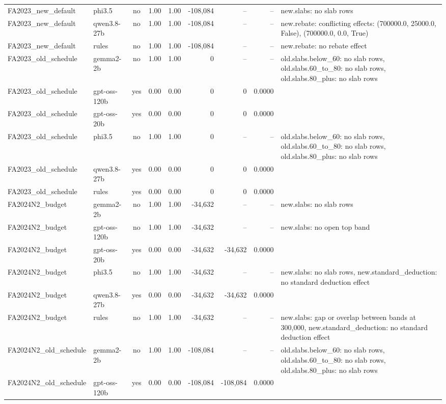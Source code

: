 \begin{table}[t]
\begin{tabular}{llcrrrrrl}
FA2023\_new\_default & phi3.5 & no & 1.00 & 1.00 & -108,084 & -- & -- & new.slabs: no slab rows \\
FA2023\_new\_default & qwen3.8-27b & no & 1.00 & 1.00 & -108,084 & -- & -- & new.rebate: conflicting effects: (700000.0, 25000.0, False), (700000.0, 0.0, True) \\
FA2023\_new\_default & rules & no & 1.00 & 1.00 & -108,084 & -- & -- & new.rebate: no rebate effect \\
FA2023\_old\_schedule & gemma2-2b & no & 1.00 & 1.00 & 0 & -- & -- & old.slabs.below\_60: no slab rows, old.slabs.60\_to\_80: no slab rows, old.slabs.80\_plus: no slab rows \\
FA2023\_old\_schedule & gpt-oss-120b & yes & 0.00 & 0.00 & 0 & 0 & 0.0000 &  \\
FA2023\_old\_schedule & gpt-oss-20b & yes & 0.00 & 0.00 & 0 & 0 & 0.0000 &  \\
FA2023\_old\_schedule & phi3.5 & no & 1.00 & 1.00 & 0 & -- & -- & old.slabs.below\_60: no slab rows, old.slabs.60\_to\_80: no slab rows, old.slabs.80\_plus: no slab rows \\
FA2023\_old\_schedule & qwen3.8-27b & yes & 0.00 & 0.00 & 0 & 0 & 0.0000 &  \\
FA2023\_old\_schedule & rules & yes & 0.00 & 0.00 & 0 & 0 & 0.0000 &  \\
FA2024N2\_budget & gemma2-2b & no & 1.00 & 1.00 & -34,632 & -- & -- & new.slabs: no slab rows \\
FA2024N2\_budget & gpt-oss-120b & no & 1.00 & 1.00 & -34,632 & -- & -- & new.slabs: no open top band \\
FA2024N2\_budget & gpt-oss-20b & yes & 0.00 & 0.00 & -34,632 & -34,632 & 0.0000 &  \\
FA2024N2\_budget & phi3.5 & no & 1.00 & 1.00 & -34,632 & -- & -- & new.slabs: no slab rows, new.standard\_deduction: no standard deduction effect \\
FA2024N2\_budget & qwen3.8-27b & yes & 0.00 & 0.00 & -34,632 & -34,632 & 0.0000 &  \\
FA2024N2\_budget & rules & no & 1.00 & 1.00 & -34,632 & -- & -- & new.slabs: gap or overlap between bands at 300,000, new.standard\_deduction: no standard deduction effect \\
FA2024N2\_old\_schedule & gemma2-2b & no & 1.00 & 1.00 & -108,084 & -- & -- & old.slabs.below\_60: no slab rows, old.slabs.60\_to\_80: no slab rows, old.slabs.80\_plus: no slab rows \\
FA2024N2\_old\_schedule & gpt-oss-120b & yes & 0.00 & 0.00 & -108,084 & -108,084 & 0.0000 &  \\

\end{tabular}
\end{table}
